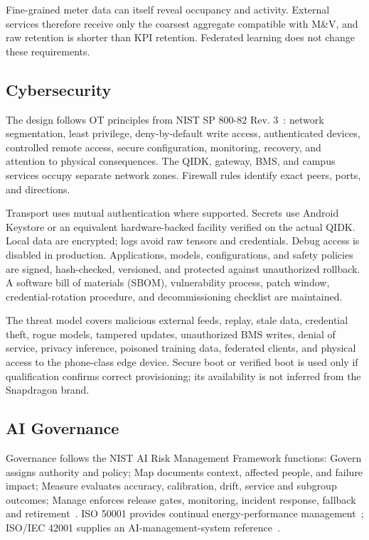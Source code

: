 Fine-grained meter data can itself reveal occupancy and activity. External services therefore receive only the coarsest aggregate compatible with M\&V, and raw retention is shorter than KPI retention. Federated learning does not change these requirements.

\subsection{Cybersecurity}

The design follows OT principles from NIST SP 800-82 Rev. 3~\cite{nist80082}: network segmentation, least privilege, deny-by-default write access, authenticated devices, controlled remote access, secure configuration, monitoring, recovery, and attention to physical consequences. The QIDK, gateway, BMS, and campus services occupy separate network zones. Firewall rules identify exact peers, ports, and directions.

Transport uses mutual authentication where supported. Secrets use Android Keystore or an equivalent hardware-backed facility verified on the actual QIDK. Local data are encrypted; logs avoid raw tensors and credentials. Debug access is disabled in production. Applications, models, configurations, and safety policies are signed, hash-checked, versioned, and protected against unauthorized rollback. A software bill of materials (SBOM), vulnerability process, patch window, credential-rotation procedure, and decommissioning checklist are maintained.

The threat model covers malicious external feeds, replay, stale data, credential theft, rogue models, tampered updates, unauthorized BMS writes, denial of service, privacy inference, poisoned training data, federated clients, and physical access to the phone-class edge device. Secure boot or verified boot is used only if qualification confirms correct provisioning; its availability is not inferred from the Snapdragon brand.

\subsection{AI Governance}

Governance follows the NIST AI Risk Management Framework functions: Govern assigns authority and policy; Map documents context, affected people, and failure impact; Measure evaluates accuracy, calibration, drift, service and subgroup outcomes; Manage enforces release gates, monitoring, incident response, fallback and retirement~\cite{nistairmf}. ISO 50001 provides continual energy-performance management~\cite{iso50001}; ISO/IEC 42001 supplies an AI-management-system reference~\cite{iso42001}.

